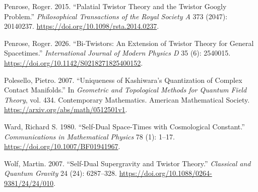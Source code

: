 \documentclass[
  english,
  11pt,
  reqno]{amsart}
\newlength{\cslhangindent}
\newenvironment{CSLReferences}[2] %
 {\begin{list}{}{%
  \setlength{\itemindent}{0pt}
  \setlength{\leftmargin}{0pt}
  \setlength{\parsep}{0pt}
  \ifodd #1
   \setlength{\leftmargin}{\cslhangindent}
   \setlength{\itemindent}{-1\cslhangindent}
  \fi
  \setlength{\itemsep}{#2\baselineskip}}}
 {\end{list}}
\begin{document}
\begin{CSLReferences}{1}{1}
Penrose, Roger. 2015. {``Palatial Twistor Theory and the Twistor Googly
Problem.''} \emph{Philosophical Transactions of the Royal Society A} 373
(2047): 20140237. \url{https://doi.org/10.1098/rsta.2014.0237}.

Penrose, Roger. 2026. {``Bi-Twistors: An Extension of Twistor Theory for
General Spacetimes.''} \emph{International Journal of Modern Physics D}
35 (6): 2540015. \url{https://doi.org/10.1142/S0218271825400152}.

Polesello, Pietro. 2007. {``Uniqueness of {Kashiwara}'s Quantization of
Complex Contact Manifolds.''} In \emph{Geometric and Topological Methods
for Quantum Field Theory}, vol. 434. Contemporary Mathematics. American
Mathematical Society. \url{https://arxiv.org/abs/math/0512501v1}.

Ward, Richard S. 1980. {``Self-Dual Space-Times with Cosmological
Constant.''} \emph{Communications in Mathematical Physics} 78 (1):
1--17. \url{https://doi.org/10.1007/BF01941967}.

Wolf, Martin. 2007. {``Self-Dual Supergravity and Twistor Theory.''}
\emph{Classical and Quantum Gravity} 24 (24): 6287--328.
\url{https://doi.org/10.1088/0264-9381/24/24/010}.

\end{CSLReferences}
\end{document}
